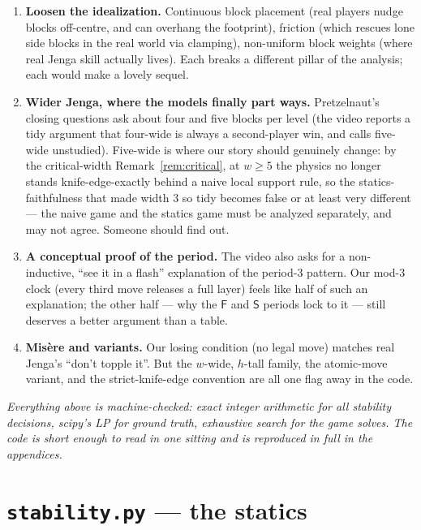\documentclass[11pt]{article}
\theoremstyle{definition}
\theoremstyle{remark}
\newcommand{\Fq}{\mathsf{F}}
\newcommand{\Sq}{\mathsf{S}}
\begin{document}
\begin{enumerate}
\item \textbf{Loosen the idealization.} Continuous block placement (real
players nudge blocks off-centre, and can overhang the footprint), friction
(which rescues lone side blocks in the real world via clamping), non-uniform
block weights (where real Jenga skill actually lives). Each breaks a
different pillar of the analysis; each would make a lovely sequel.
\item \textbf{Wider Jenga, where the models finally part ways.}
Pretzelnaut's closing questions ask about four and five blocks per level
(the video reports a tidy argument that four-wide is always a
second-player win, and calls five-wide unstudied). Five-wide is where our
story should genuinely change: by the critical-width
Remark~\ref{rem:critical}, at $w \ge 5$ the physics no longer stands
knife-edge-exactly behind a naive local support rule, so the
statics-faithfulness that made width 3 so tidy becomes false or at least
very different --- the naive game and the statics game must be analyzed
separately, and may not agree. Someone should find out.
\item \textbf{A conceptual proof of the period.} The video also asks for a
non-inductive, ``see it in a flash'' explanation of the period-3 pattern.
Our mod-3 clock (every third move releases a full layer) feels like half of
such an explanation; the other half --- why the $\Fq$ and $\Sq$ periods
lock to it --- still deserves a better argument than a table.
\item \textbf{Misère and variants.} Our losing condition (no legal move)
matches real Jenga's ``don't topple it''. But the $w$-wide, $h$-tall
family, the atomic-move variant, and the strict-knife-edge convention are
all one flag away in the code.
\end{enumerate}

\vspace{1em}
\noindent\emph{Everything above is machine-checked: exact integer
arithmetic for all stability decisions, scipy's LP for ground truth,
exhaustive search for the game solves. The code is short enough to read in
one sitting and is reproduced in full in the appendices.}

\appendix

\section{\texttt{stability.py} --- the statics}
\end{document}
